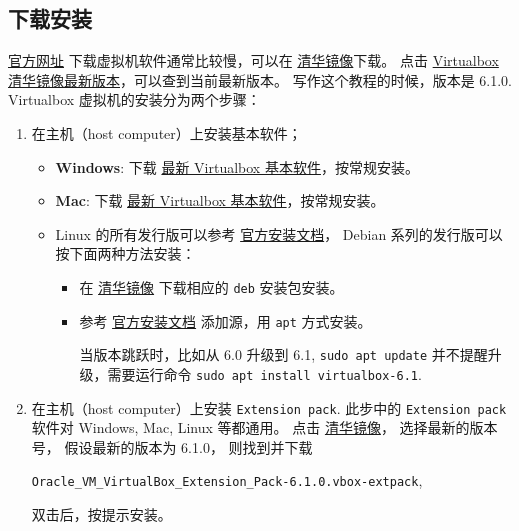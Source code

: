 \documentclass[
    11pt,
    cite=authoryear,
    device=normal,
    lang=cn,
    mode=simple,
    result=answer,
    toc=onecol,
]{elegantbook_sierxue}
\begin{document}
\subsection{下载安装}%
\label{sub:vbox-install}
\href{https://www.virtualbox.org/wiki/Downloads}{官方网址}
下载虚拟机软件通常比较慢，可以在
\href{https://mirror.tuna.tsinghua.edu.cn/virtualbox/}{清华镜像}下载。
点击
\href{https://mirror.tuna.tsinghua.edu.cn/virtualbox/LATEST.TXT}
{Virtualbox清华镜像最新版本}，可以查到当前最新版本。
写作这个教程的时候，版本是 6.1.0.
Virtualbox 虚拟机的安装分为两个步骤：
\begin{enumerate}
    \item 在主机（host computer）上安装基本软件；
        \begin{itemize}
            \item \textbf{Windows}: 下载
                \href{https://mirror.tuna.tsinghua.edu.cn/virtualbox/virtualbox-Win-latest.exe}
                {最新 Virtualbox 基本软件}，按常规安装。
            \item \textbf{Mac}: 下载
                \href{https://mirror.tuna.tsinghua.edu.cn/virtualbox/virtualbox-osx-latest.dmg}
                {最新 Virtualbox 基本软件}，按常规安装。
            \item Linux 的所有发行版可以参考
                \href{https://www.virtualbox.org/wiki/Linux_Downloads}{官方安装文档}，
                Debian 系列的发行版可以按下面两种方法安装：
                \begin{itemize}
                    \item 在
                        \href{https://mirror.tuna.tsinghua.edu.cn/virtualbox/}
                        {清华镜像}
                        下载相应的 \lstinline{deb} 安装包安装。
                    \item 参考
                        \href{https://www.virtualbox.org/wiki/Linux_Downloads}
                        {官方安装文档}
                        添加源，用 \lstinline{apt} 方式安装。
                        \begin{note}\label{note:vbox-apt-upgrade}
                           当版本跳跃时，比如从 6.0 升级到 6.1,
                           \lstinline{sudo apt update}
                           并不提醒升级，需要运行命令
                           \lstinline{sudo apt install virtualbox-6.1}.
                        \end{note}
                \end{itemize}
        \end{itemize}
    \item 在主机（host computer）上安装 \lstinline{Extension pack}.
        此步中的 \lstinline{Extension pack} 软件对 Windows, Mac, Linux
        等都通用。
        点击
        \href{https://mirror.tuna.tsinghua.edu.cn/virtualbox/}{清华镜像}，
        选择最新的版本号，
        假设最新的版本为 6.1.0，
        则找到并下载
        \begin{center}\label{}
            \lstinline{Oracle_VM_VirtualBox_Extension_Pack-6.1.0.vbox-extpack},
        \end{center}
        双击后，按提示安装。
\end{enumerate}
\end{document}
